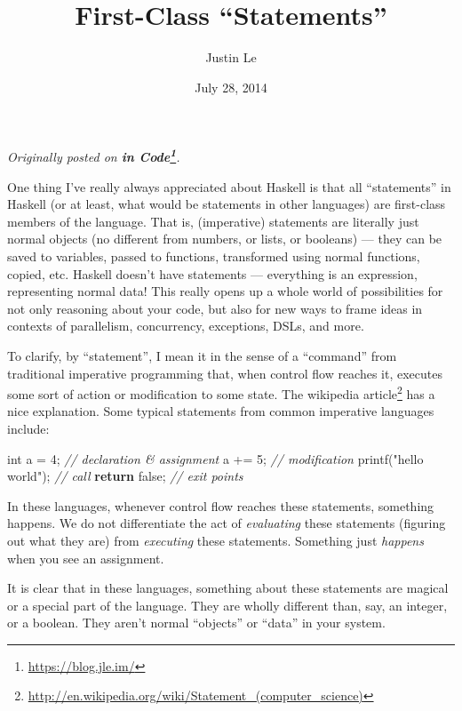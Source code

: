 \documentclass[]{article}
\title{First-Class ``Statements''}
\author{Justin Le}
\date{July 28, 2014}
\newenvironment{Shaded}{}{}
\newcommand{\KeywordTok}[1]{\textcolor[rgb]{0.00,0.44,0.13}{\textbf{{#1}}}}
\newcommand{\DataTypeTok}[1]{\textcolor[rgb]{0.56,0.13,0.00}{{#1}}}
\newcommand{\DecValTok}[1]{\textcolor[rgb]{0.25,0.63,0.44}{{#1}}}
\newcommand{\StringTok}[1]{\textcolor[rgb]{0.25,0.44,0.63}{{#1}}}
\newcommand{\CommentTok}[1]{\textcolor[rgb]{0.38,0.63,0.69}{\textit{{#1}}}}
\newcommand{\NormalTok}[1]{{#1}}
\renewcommand{\href}[2]{#2\footnote{\url{#1}}}
\begin{document}
\maketitle

\emph{Originally posted on \textbf{\href{https://blog.jle.im/}{in
Code}}.}

One thing I've really always appreciated about Haskell is that all
``statements'' in Haskell (or at least, what would be statements in
other languages) are first-class members of the language. That is,
(imperative) statements are literally just normal objects (no different
from numbers, or lists, or booleans) --- they can be saved to variables,
passed to functions, transformed using normal functions, copied, etc.
Haskell doesn't have statements --- everything is an expression,
representing normal data! This really opens up a whole world of
possibilities for not only reasoning about your code, but also for new
ways to frame ideas in contexts of parallelism, concurrency, exceptions,
DSLs, and more.

To clarify, by ``statement'', I mean it in the sense of a ``command''
from traditional imperative programming that, when control flow reaches
it, executes some sort of action or modification to some state. The
\href{http://en.wikipedia.org/wiki/Statement_(computer_science)}{wikipedia
article} has a nice explanation. Some typical statements from common
imperative languages include:

\begin{Shaded}
\begin{Highlighting}[]
\DataTypeTok{int} \NormalTok{a = }\DecValTok{4}\NormalTok{;              }\CommentTok{// declaration & assignment}
\NormalTok{a += }\DecValTok{5}\NormalTok{;                 }\CommentTok{// modification}
\NormalTok{printf(}\StringTok{"hello world"}\NormalTok{);  }\CommentTok{// call}
\KeywordTok{return} \NormalTok{false;           }\CommentTok{// exit points}
\end{Highlighting}
\end{Shaded}

In these languages, whenever control flow reaches these statements,
something happens. We do not differentiate the act of \emph{evaluating}
these statements (figuring out what they are) from \emph{executing}
these statements. Something just \emph{happens} when you see an
assignment.

It is clear that in these languages, something about these statements
are magical or a special part of the language. They are wholly different
than, say, an integer, or a boolean. They aren't normal ``objects'' or
``data'' in your system.
\end{document}
